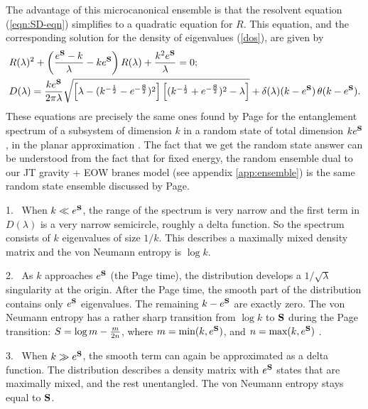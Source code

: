 \documentclass[12pt]{article}
\newcommand{\be}{\begin{equation}}
\newcommand{\ee}{\end{equation}}
\numberwithin{equation}{section}
\begin{document}
The advantage of this microcanonical ensemble is that the resolvent equation (\ref{eqn:SD-eqn}) simplifies to a quadratic equation for $R$. This equation, and the corresponding solution for the density of eigenvalues (\ref{dos}), are given by
\be
\begin{split}
	&R(\lambda)^2+\left({e^{{\bf S}}-k\over \lambda}-ke^{{\bf S}}\right)R(\lambda)+{k^2e^{{\bf S}}\over \lambda}=0;\\
	&D(\lambda)={k e^{{\bf S}}\over 2\pi \lambda}\sqrt{\left[\lambda-(k^{-{1\over2}}-e^{-{{\bf S}\over 2}})^2\right]\left[(k^{-{1\over 2}}+e^{-{{\bf S}\over 2}})^2-\lambda\right]}+\delta(\lambda) (k-e^{{\bf S}})\,\theta(k-e^{{\bf S}}).\label{microcanonicalAns}
\end{split}
\ee
These equations are precisely the same ones found by Page for the entanglement spectrum of a subsystem of dimension $k$ in a random state of total dimension $k e^{{\bf S}}$, in the planar approximation \cite{Page:1993df}. The fact that we get the random state answer can be understood from the fact that for fixed energy, the random ensemble dual to our JT gravity + EOW branes model (see appendix \ref{app:ensemble}) is the same random state ensemble discussed by Page.

1. \  When $k\ll e^{{\bf S}}$, the range of the spectrum is very narrow and the first term in $D(\lambda)$ is a very narrow semicircle, roughly a delta function. So the spectrum consists of $k$ eigenvalues of size $1/k$. This  describes a maximally mixed density matrix and the von Neumann entropy is $\log k$.

2. \ As $k$ approaches $e^{{\bf S}}$ (the Page time), the distribution develops a $1 / \sqrt{\lambda}$ singularity at the origin. After the Page time, the smooth part of the distribution contains only $e^{\bf{S}}$ eigenvalues. The remaining $k-e^{{\bf S}}$ are exactly zero. The von Neumann entropy has a rather sharp transition from $\log k$ to ${\bf S}$ during the Page transition: $S=\log m-{m\over 2n}$, where $m=\text{min}(k,e^{{\bf S}})$, and $n=\text{max}(k,e^{{\bf S}})$ \cite{Page:1993df}.

3. \ When $k\gg e^{{\bf S}}$, the smooth term can again be approximated as a delta function. The distribution describes a density matrix with $e^{{\bf S}}$ states that are maximally mixed, and the rest unentangled. The von Neumann entropy stays equal to ${\bf S}$.
\end{document}
